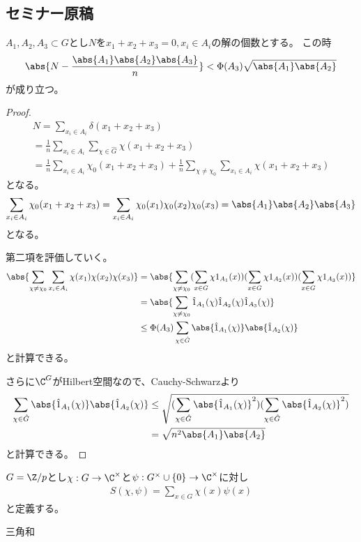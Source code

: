 \documentclass{jsarticle}
\begin{document}
\subsection{セミナー原稿}
\begin{thm}
$A_1, A_2, A_3 \subset G$とし$N$を$x_1+x_2+x_3=0, x_i\in A_i$の解の個数とする。
この時
\begin{align*}
\abs{N-\frac{\abs{A_1}\abs{A_2}\abs{A_3}}{n}}<\Phi(A_3)\sqrt{\abs{A_1}\abs{A_2}}
\end{align*}
が成り立つ。
\end{thm}
\begin{proof}
\begin{align*}
N=\sum_{x_i\in A_i}\delta(x_1+x_2+x_3)\\
=\frac{1}{n}\sum_{x_i\in A_i}\sum_{\chi\in\hat{G}}\chi(x_1+x_2+x_3)\\
=\frac{1}{n}\sum_{x_i\in A_i}\chi_0(x_1+x_2+x_3)+\frac{1}{n}\sum_{\chi\neq\chi_0}\sum_{x_i\in A_i}\chi(x_1+x_2+x_3)
\end{align*}
となる。
\begin{align*}
\sum_{x_i\in A_i}\chi_0(x_1+x_2+x_3)=\sum_{x_i\in A_i}\chi_0(x_1)\chi_0(x_2)\chi_0(x_3)=\abs{A_1}\abs{A_2}\abs{A_3}
\end{align*}
となる。

第二項を評価していく。
\begin{align*}
\abs{\sum_{\chi\neq\chi_0}\sum_{x_i\in A_i}\chi(x_1)\chi(x_2)\chi(x_3)}&
=\abs{\sum_{\chi\neq\chi_0}(\sum_{x\in G}\chi1_{A_1}(x))(\sum_{x\in G}\chi1_{A_2}(x))(\sum_{x\in G}\chi1_{A_3}(x))}\\
&=\abs{\sum_{\chi\neq\chi_0}\hat{1}_{A_1}(\chi)\hat{1}_{A_2}(\chi)\hat{1}_{A_3}(\chi)}\\
&\leq\Phi(A_3)\sum_{\chi\in\hat{G}}\abs{\hat{1}_{A_1}(\chi)}\abs{\hat{1}_{A_2}(\chi)}\\
\end{align*}
と計算できる。

さらに$\C^G$がHilbert空間なので、Cauchy-Schwarzより
\begin{align*}
\sum_{\chi\in\hat{G}}\abs{\hat{1}_{A_1}(\chi)}\abs{\hat{1}_{A_2}(\chi)}
&\leq\sqrt{(\sum_{\chi\in\hat{G}}\abs{\hat{1}_{A_1}(\chi)}^2)(\sum_{\chi\in\hat{G}}\abs{\hat{1}_{A_2}(\chi)}^2)}\\
&=\sqrt{n^2\abs{A_1}\abs{A_2}}
\end{align*}
と計算できる。
\end{proof}


\begin{dfn}[Gauss和]
$G=\Z/p$とし$\chi:G \to \C^\times$と$\psi:G^\times\cup\{0\}\to\C^\times$に対し
\begin{align*}
S(\chi,\psi)=\sum_{x\in G}\chi(x)\psi(x)
\end{align*}
と定義する。
\end{dfn}
三角和
\end{document}
